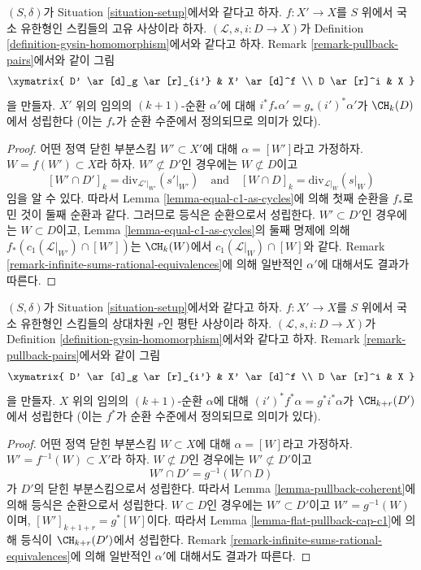 \begin{lemma}
\label{lemma-closed-in-X-gysin}
$(S, \delta)$가 Situation \ref{situation-setup}에서와 같다고 하자.
$f : X' \to X$를 $S$ 위에서 국소 유한형인 스킴들의 고유 사상이라 하자.
$(\mathcal{L}, s, i : D \to X)$가 Definition
\ref{definition-gysin-homomorphism}에서와 같다고 하자. Remark
\ref{remark-pullback-pairs}에서와 같이 그림
$$
\xymatrix{
D' \ar[d]_g \ar[r]_{i'} & X' \ar[d]^f \\
D \ar[r]^i & X
}
$$
을 만들자. $X'$ 위의 임의의 $(k + 1)$-순환 $\alpha'$에 대해
$i^*f_*\alpha' = g_*(i')^*\alpha'$가 $\CH_k(D)$에서 성립한다
(이는 $f_*$가 순환 수준에서 정의되므로 의미가 있다).
\end{lemma}

\begin{proof}
어떤 정역 닫힌 부분스킴 $W' \subset X'$에 대해
$\alpha = [W']$라고 가정하자. $W = f(W') \subset X$라 하자.
$W' \not \subset D'$인 경우에는 $W \not \subset D$이고
$$
[W' \cap D']_k = \text{div}_{\mathcal{L}'|_{W'}}({s'|_{W'}})
\quad\text{and}\quad
[W \cap D]_k = \text{div}_{\mathcal{L}|_W}(s|_W)
$$
임을 알 수 있다. 따라서 Lemma \ref{lemma-equal-c1-as-cycles}에 의해 첫째
순환을 $f_*$로 민 것이 둘째 순환과 같다. 그러므로 등식은 순환으로서
성립한다. $W' \subset D'$인 경우에는 $W \subset D$이고, Lemma
\ref{lemma-equal-c1-as-cycles}의 둘째 명제에 의해
$f_*(c_1(\mathcal{L}|_{W'}) \cap [W'])$는 $\CH_k(W)$에서
$c_1(\mathcal{L}|_W) \cap [W]$와 같다. Remark
\ref{remark-infinite-sums-rational-equivalences}에 의해 일반적인
$\alpha'$에 대해서도 결과가 따른다.
\end{proof}

\begin{lemma}
\label{lemma-gysin-flat-pullback}
$(S, \delta)$가 Situation \ref{situation-setup}에서와 같다고 하자.
$f : X' \to X$를 $S$ 위에서 국소 유한형인 스킴들의 상대차원 $r$인 평탄
사상이라 하자. $(\mathcal{L}, s, i : D \to X)$가 Definition
\ref{definition-gysin-homomorphism}에서와 같다고 하자. Remark
\ref{remark-pullback-pairs}에서와 같이 그림
$$
\xymatrix{
D' \ar[d]_g \ar[r]_{i'} & X' \ar[d]^f \\
D \ar[r]^i & X
}
$$
을 만들자. $X$ 위의 임의의 $(k + 1)$-순환 $\alpha$에 대해
$(i')^*f^*\alpha = g^*i^*\alpha$가 $\CH_{k + r}(D')$에서 성립한다
(이는 $f^*$가 순환 수준에서 정의되므로 의미가 있다).
\end{lemma}

\begin{proof}
어떤 정역 닫힌 부분스킴 $W \subset X$에 대해 $\alpha = [W]$라고
가정하자. $W' = f^{-1}(W) \subset X'$라 하자. $W \not \subset D$인
경우에는 $W' \not \subset D'$이고
$$
W' \cap D' = g^{-1}(W \cap D)
$$
가 $D'$의 닫힌 부분스킴으로서 성립한다. 따라서 Lemma
\ref{lemma-pullback-coherent}에 의해 등식은 순환으로서 성립한다.
$W \subset D$인 경우에는 $W' \subset D'$이고 $W' = g^{-1}(W)$이며,
$[W']_{k + 1 + r} = g^*[W]$이다. 따라서 Lemma
\ref{lemma-flat-pullback-cap-c1}에 의해 등식이 $\CH_{k + r}(D')$에서
성립한다. Remark \ref{remark-infinite-sums-rational-equivalences}에 의해
일반적인 $\alpha'$에 대해서도 결과가 따른다.
\end{proof}








